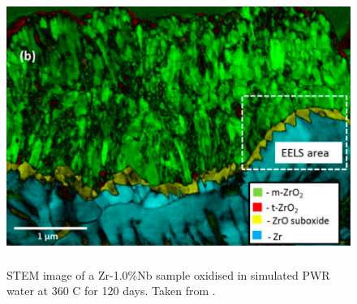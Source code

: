 \begin{figure}
    \centering
    \includegraphics[height=9cm]{images/zro_interface.png}
    \caption[STEM image of a Zr-1.0\%Nb sample oxidised in simulated PWR water at 360 C for 120 days.]{STEM image of a Zr-1.0\%Nb sample oxidised in simulated PWR water at 360 C for 120 days. Taken from \cite{inproceedings}.}
    \label{fig:zro_interface}
\end{figure}